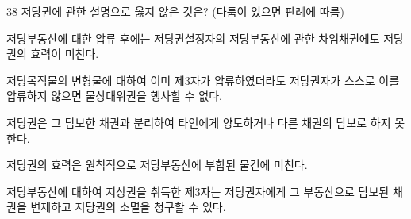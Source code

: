 \begin{question}{38}
저당권에 관한 설명으로 옳지 않은 것은? (다툼이 있으면 판례에 따름)
\begin{choices}
  \item 저당부동산에 대한 압류 후에는 저당권설정자의 저당부동산에 관한 차임채권에도 저당권의 효력이 미친다.
  \item 저당목적물의 변형물에 대하여 이미 제3자가 압류하였더라도 저당권자가 스스로 이를 압류하지 않으면 물상대위권을 행사할 수 없다.
  \item 저당권은 그 담보한 채권과 분리하여 타인에게 양도하거나 다른 채권의 담보로 하지 못한다.
  \item 저당권의 효력은 원칙적으로 저당부동산에 부합된 물건에 미친다.
  \item 저당부동산에 대하여 지상권을 취득한 제3자는 저당권자에게 그 부동산으로 담보된 채권을 변제하고 저당권의 소멸을 청구할 수 있다.
\end{choices}
\end{question}
